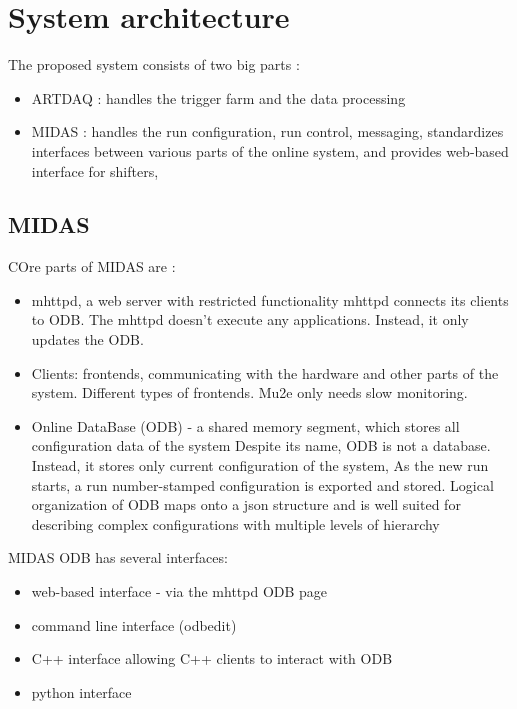 \section{System architecture}

The proposed system consists of two big parts :
\begin{itemize}
\item
  ARTDAQ : handles the trigger farm and the data processing
\item
  MIDAS : handles the run configuration, run control, messaging,
  standardizes interfaces between various parts of the online system,
  and provides web-based interface for shifters,
\end{itemize}

\subsection{MIDAS}

COre parts of MIDAS are :

\begin{itemize}
\item 
  mhttpd, a web server with restricted functionality
  mhttpd connects its clients to ODB. 
  The mhttpd doesn't execute any applications. Instead, it only updates the ODB.
\item
  Clients: frontends, communicating with the hardware and other
  parts of the system. Different types of frontends. Mu2e only needs slow monitoring.
\item
  Online DataBase (ODB) - a shared memory segment, which stores all configuration
  data of the system
  Despite its name, ODB is not a database. Instead, it stores only current configuration
  of the system, As the new run starts, a run number-stamped configuration is exported and stored.
  Logical organization of ODB maps onto a json structure and is well suited for describing
  complex configurations with multiple levels of hierarchy
\end{itemize}

MIDAS ODB has several interfaces:
\begin{itemize}
\item 
  web-based interface - via the mhttpd ODB page
\item
  command line interface (odbedit)
\item
  C++ interface allowing C++ clients to interact with ODB
\item
  python interface
\end{itemize}

